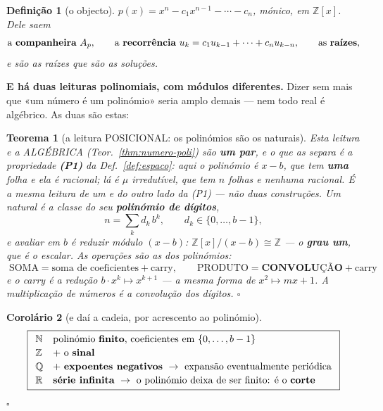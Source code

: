 \documentclass[11pt,a4paper]{article}
\newtheorem{teorema}{Teorema}
\newtheorem{corolario}[teorema]{Corolário}
\newtheorem{definicao}{Definição}
\begin{document}
\begin{definicao}[o objecto]\label{def:poli}
$p(x)=x^{n}-c_1x^{n-1}-\cdots-c_n$, mónico, em $\mathbb{Z}[x]$. Dele saem
\[
\text{a \textbf{companheira} } A_p,
\qquad
\text{a \textbf{recorrência} } u_{k}=c_1u_{k-1}+\cdots+c_nu_{k-n},
\qquad
\text{as \textbf{raízes}} ,
\]
e são as raízes que são as \emph{soluções}.
\end{definicao}

\noindent\textbf{E há duas leituras polinomiais, com módulos diferentes.} Dizer
sem mais que «um número é um polinómio» seria amplo demais --- nem todo real é
algébrico. As duas são estas:

\begin{teorema}[a leitura POSICIONAL: os polinómios são os naturais]\label{thm:posicional}
\emph{Esta leitura e a ALGÉBRICA (Teor.~\ref{thm:numero-poli}) são \textbf{um par}, e o que
as separa é a propriedade} \textbf{(P1)} \emph{da Def.~\ref{def:espaco}}: aqui o polinómio
é $x-b$, que tem \textbf{uma} folha e ela é \emph{racional}; lá é $\mu$ irredutível, que
tem $n$ folhas e \emph{nenhuma} racional. \emph{É a mesma leitura de um e do outro lado da
(P1)} --- não duas construções.
Um natural é a classe do seu \textbf{polinómio de dígitos},
\[
n=\sum_k d_k\,b^{k},\qquad d_k\in\{0,\ldots,b-1\},
\]
e \emph{avaliar em $b$ é reduzir módulo $(x-b)$}: $\mathbb{Z}[x]/(x-b)\cong
\mathbb{Z}$ --- o \textbf{grau um}, que é o escalar. As operações são as dos
polinómios:
\[
\boxed{\;\text{SOMA}=\text{soma de coeficientes}+\text{carry},
\qquad
\text{PRODUTO}=\textbf{CONVOLUÇÃO}+\text{carry}\;}
\]
e o \emph{carry} é a redução $b\cdot x^{k}\mapsto x^{k+1}$ --- a mesma forma de
$x^{2}\mapsto mx+1$. \emph{A multiplicação de números é a convolução dos
dígitos.} $\square$
\end{teorema}

\begin{corolario}[e daí a cadeia, por acrescento ao polinómio]\label{cor:cadeia}
\[
\boxed{
\begin{array}{ll}
\mathbb{N} & \text{polinómio \textbf{finito}, coeficientes em }\{0,\ldots,b-1\}\\[2pt]
\mathbb{Z} & +\ \text{o \textbf{sinal}}\\[2pt]
\mathbb{Q} & +\ \text{\textbf{expoentes negativos}}\ \to\ \text{expansão eventualmente periódica}\\[2pt]
\mathbb{R} & \textbf{série infinita}\ \to\ \text{o polinómio deixa de ser finito: é o \textbf{corte}}
\end{array}}
\]
$\square$
\end{corolario}
\end{document}
